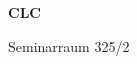 \documentclass[a4paper]{article}
\begin{document}
\printGenericVSLHeader
\begin{center}
\begin{vsltext}{3cm}{4cm}

   \vspace{0.5cm} 

    \textbf{CLC} 

    \vspace{1.5cm}

    Seminarraum 325/2

\end{vsltext}

\end{center}
\end{document}
